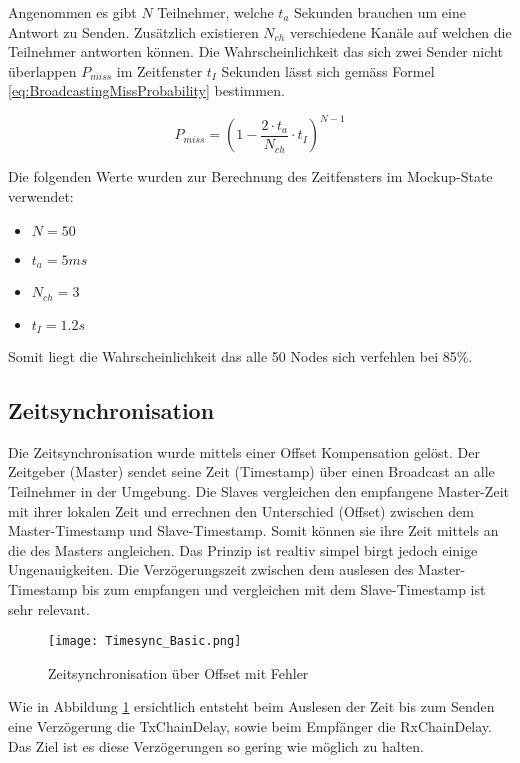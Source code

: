 Angenommen es gibt $N$ Teilnehmer, welche $t_a$ Sekunden brauchen um eine Antwort zu Senden. Zusätzlich existieren $N_{ch}$ verschiedene Kanäle auf welchen die Teilnehmer antworten können. Die Wahrscheinlichkeit das sich zwei Sender nicht überlappen $P_{miss}$ im Zeitfenster $t_I$ Sekunden lässt sich gemäss Formel \ref{eq:BroadcastingMissProbability} bestimmen. \cite{rk_how_to_deal_with_broadcasting_collision_2020}

\begin{equation}\label{eq:BroadcastingMissProbability}
P_{miss} = (1- \frac{2 \cdot t_a}{N_{ch}} \cdot t_I)^{N-1}
\end{equation}

Die folgenden Werte wurden zur Berechnung des Zeitfensters im Mockup-State verwendet:

\begin{itemize}
	\item $N = 50$
	\item $t_a = 5ms$
	\item $N_{ch} = 3$
	\item $t_I = 1.2s$	
\end{itemize} 

Somit liegt die Wahrscheinlichkeit das alle 50 Nodes sich verfehlen bei 85\%. 

\subsection{Zeitsynchronisation}\label{sec:ZeitsynchronisationP2P}

Die Zeitsynchronisation wurde mittels einer Offset Kompensation gelöst. Der Zeitgeber (Master) sendet seine Zeit (Timestamp) über einen Broadcast an alle Teilnehmer in der Umgebung. Die Slaves vergleichen den empfangene Master-Zeit mit ihrer lokalen Zeit und errechnen den Unterschied (Offset) zwischen dem Master-Timestamp und Slave-Timestamp. Somit können sie ihre Zeit mittels an die des Masters angleichen. Das Prinzip ist realtiv simpel birgt jedoch einige Ungenauigkeiten. Die Verzögerungszeit zwischen dem auslesen des Master-Timestamp bis zum empfangen und vergleichen mit dem Slave-Timestamp ist sehr relevant.  

\begin{figure} [H]
	\centering
	\texttt{[image: Timesync\_Basic.png]}
	\caption{Zeitsynchronisation über Offset mit Fehler}
	\label{fig:TimesyncBasicwithErrorP2P}
\end{figure}

Wie in Abbildung \ref{fig:TimesyncBasicwithErrorP2P} ersichtlich entsteht beim Auslesen der Zeit bis zum Senden eine Verzögerung die TxChainDelay, sowie beim Empfänger die RxChainDelay. Das Ziel ist es diese Verzögerungen so gering wie möglich zu halten. 

